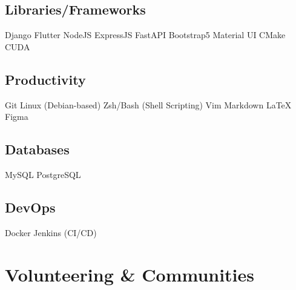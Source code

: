 \documentclass[]{openfont}
\begin{document}
\begin{minipage}[t]{0.33\textwidth}
    \subsection{Libraries/Frameworks}
    Django \textbullet{} Flutter \textbullet{} NodeJS \textbullet{} ExpressJS \textbullet{} FastAPI \textbullet{} Bootstrap5 \textbullet{} Material UI \textbullet{} CMake \textbullet{} CUDA
    \sectionsep

    \subsection{Productivity}
    Git \textbullet{} Linux (Debian-based) \textbullet{} Zsh/Bash (Shell Scripting) \textbullet{} Vim \textbullet{} Markdown \textbullet{} LaTeX \textbullet{} Figma
    \sectionsep

    \subsection{Databases}
    MySQL \textbullet{} PostgreSQL
    \sectionsep

    \subsection{DevOps}
    Docker \textbullet{} Jenkins (CI/CD)
    \sectionsep

    \section{Volunteering \& Communities}

    \textbullet{} 

    \textbullet{} 

    \textbullet{} 

    \textbullet{} 



\end{minipage}
\end{document}
